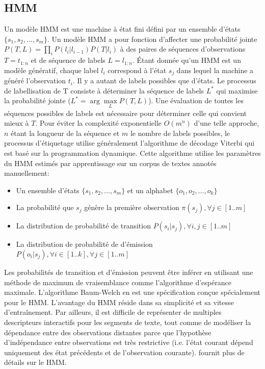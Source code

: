 \subsection{HMM}
Un modèle HMM est une machine à état fini défini par un ensemble d'états $ \lbrace s_1, s_2, ..., s_m \rbrace $. Un modèle HMM a pour fonction d'affecter une probabilité jointe 
$ P (T , L) = \prod\limits_i P(l_i \vert l_{i-1})P(T \vert l_i)$  à des paires de séquences d'observations $ T = t_{1: n} $ et de séquence de labels $ L = l_{1:n} $. Étant donnée qu'un HMM est un modèle génératif, chaque label $l_i$ correspond à l'état $s_j$ dans lequel la machine a généré l'observation $t_i$. Il y a autant de labels possibles que d'états. Le processus de labellisation de T consiste à déterminer la séquence de labels $ L^* $ qui maximise la probabilité jointe ($L^* = \arg \max\limits_L P(T, L)$). Une évaluation de toutes les séquences possibles de labels est nécessaire pour déterminer celle qui convient mieux à $ T $. Pour éviter la complexité exponentielle $ O(m^n)$ d'une telle approche, $n$ étant la longueur de la séquence et $m$ le nombre de labels possibles, le processus d'étiquetage utilise généralement l'algorithme de décodage Viterbi \citep{viterbi1967viterbi} qui est basé sur la programmation dynamique. Cette algorithme utilise les paramètres du HMM estimés par apprentissage sur un corpus de textes annotés manuellement:
\begin{itemize}
\item Un ensemble d'états $ \lbrace s_1, s_2, ..., s_m \rbrace $ et un alphabet $ \lbrace o_1, o_2, ..., o_k \rbrace $
\item La probabilité que $ s_j $ génère la première observation $ \pi(s_j), \forall j \in [1 .. m] $
\item La distribution de probabilité de transition $ P (s_i\vert s_j),  \forall i,j \in [1 .. m] $
\item La distribution de probabilité de d'émission $ P(o_i\vert s_j), \forall i \in [1 .. k], \forall j \in [1 .. m]$
\end{itemize}

Les probabilités de transition et d'émission peuvent être inférer en utilisant une méthode de maximum de vraisemblance comme l'algorithme d'espérance maximale. L'algorithme Baum-Welch \citep{welch2003baumwelch} en est une spécification conçue spécialement pour le HMM. L'avantage du HMM réside dans sa simplicité et sa vitesse d'entraînement. Par ailleurs, il est difficile de représenter de multiples descripteurs interactifs pour les segments de texte, tout comme de modéliser la dépendance entre des observations distantes parce que l'hypothèse d'indépendance entre observations est très restrictive (i.e. l'état courant dépend uniquement des état précédents et de l'observation courante). \citet{rabiner1989tutorial} fournit plus de détails sur le HMM.

